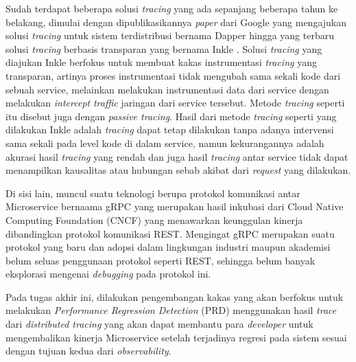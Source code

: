  Sudah terdapat beberapa solusi \textit{tracing} yang ada sepanjang beberapa tahun ke belakang, dimulai dengan dipublikasikannya \textit{paper} dari Google yang mengajukan solusi \textit{tracing} untuk sistem terdistribusi bernama Dapper \citep{dapper-paper} hingga yang terbaru solusi \textit{tracing} berbasis transparan yang bernama Inkle \citep{tracing-abram}. Solusi \textit{tracing} yang diajukan Inkle berfokus untuk membuat kakas instrumentasi \textit{tracing} yang transparan, artinya proses instrumentasi tidak mengubah sama sekali kode dari sebuah service, melainkan melakukan instrumentasi data dari service dengan melakukan \textit{intercept} \textit{traffic} jaringan dari service tersebut. Metode \textit{tracing} seperti itu disebut juga dengan \textit{passive tracing}. Hasil dari metode \textit{tracing} seperti yang dilakukan Inkle adalah \textit{tracing} dapat tetap dilakukan tanpa adanya intervensi sama sekali pada level kode di dalam service, namun kekurangannya adalah akurasi hasil \textit{tracing} yang rendah dan juga hasil \textit{tracing} antar service tidak dapat menampilkan kausalitas atau hubungan sebab akibat dari \textit{request} yang dilakukan.
 
Di sisi lain, muncul suatu teknologi berupa protokol komunikasi antar Microservice bernaama gRPC \citep{grpc} yang merupakan hasil inkubasi dari Cloud Native Computing Foundation (CNCF) yang menawarkan keunggulan kinerja dibandingkan protokol komunikasi REST. Mengingat gRPC merupakan suatu protokol yang baru dan adopsi dalam lingkungan industri maupun akademisi belum seluas penggunaan protokol seperti REST, sehingga belum banyak eksplorasi mengenai \textit{debugging} pada protokol ini.
  
Pada tugas akhir ini, dilakukan pengembangan kakas yang akan berfokus untuk melakukan \textit{Performance Regression Detection} (PRD) menggunakan hasil \textit{trace} dari \textit{distributed tracing} yang akan dapat membantu para \textit{developer} untuk mengembalikan kinerja Microservice setelah terjadinya regresi pada sistem sesuai dengan tujuan kedua dari \textit{observability}. 


